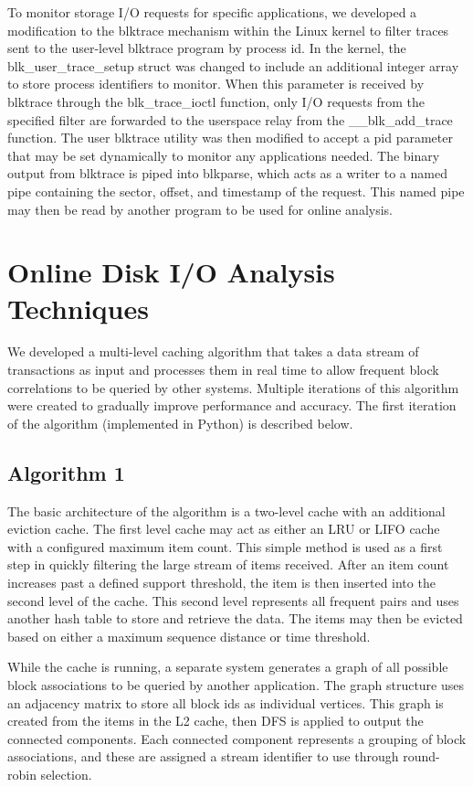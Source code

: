 \documentclass[MEng]{uofl}
\begin{document}
To monitor storage I/O requests for specific applications, we developed a modification to the blktrace mechanism within the Linux kernel to filter traces sent to the user-level blktrace program by process id. 
In the kernel, the blk\_user\_trace\_setup struct was changed to include an additional integer array to store process identifiers to monitor. 
When this parameter is received by blktrace through the blk\_trace\_ioctl function, only I/O requests from the specified filter are forwarded to the userspace relay from the \_\_blk\_add\_trace function. 
The user blktrace utility was then modified to accept a pid parameter that may be set dynamically to monitor any applications needed. The binary output from blktrace is piped into blkparse, which acts as a writer to a named pipe containing the sector, offset, and timestamp of the request. This named pipe may then be read by another program to be used for online analysis. 

\section{Online Disk I/O Analysis Techniques}
We developed a multi-level caching algorithm that takes a data stream of transactions as input and processes them in real time to allow frequent block correlations to be queried by other systems. Multiple iterations of this algorithm were created to gradually improve performance and accuracy. The first iteration of the algorithm (implemented in Python) is described below. 

\subsection{Algorithm 1}
The basic architecture of the algorithm is a two-level cache with an additional eviction cache. The first level cache may act as either an LRU or LIFO cache with a configured maximum item count. This simple method is used as a first step in quickly filtering the large stream of items received. After an item count increases past a defined support threshold, the item is then inserted into the second level of the cache. This second level represents all frequent pairs and uses another hash table to store and retrieve the data. The items may then be evicted based on either a maximum sequence distance or time threshold. 

While the cache is running, a separate system generates a graph of all possible block associations to be queried by another application. The graph structure uses an adjacency matrix to store all block ids as individual vertices. This graph is created from the items in the L2 cache, then DFS is applied to output the connected components. Each connected component represents a grouping of block associations, and these are assigned a stream identifier to use through round-robin selection. 
\end{document}
